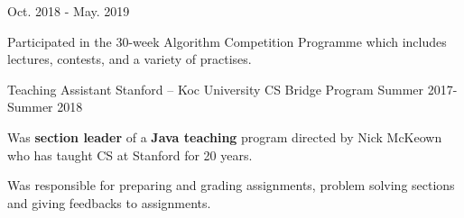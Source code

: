 \begin{cventries}
    {Oct. 2018 - May. 2019} %
    {
      \begin{cvitems} %
        \item {Participated in the 30-week Algorithm Competition Programme which includes lectures, contests, and a variety of practises.}
      \end{cvitems}
    }
    \vspace{2mm}
  \cventry
    {Teaching Assistant } %
    {Stanford – Koc University CS Bridge Program} %
    {} %
    {Summer 2017-Summer 2018} %
    {
      \begin{cvitems} %
        \item {Was \textbf{section leader} of a \textbf{Java teaching} program directed by Nick McKeown who has taught CS at Stanford for 20 years.}
        \item {Was responsible for preparing and grading assignments, problem solving sections and giving feedbacks to assignments.}
      \end{cvitems}
    }
  \vspace{2mm}

\begin{comment}
Commented code

\cventry
    {Member} %
    {Association for Computing Machinery Society} %
    {Koc Universtiy} %
    {Oct. 2017 - Present} %
    {
      \begin{cvitems} %
        \item {Responsible for organizing IoT and robotics related workshops, conferences for new members. }
        \item {Developing tech-projects to attend national and international competitions. }
      \end{cvitems}
    }

  \cventry
    {Global Volunteer in Egypt } %
    {AIESEC} %
    {Cairo, Egypt} %
    {Summer 2015} %
    {
      \begin{cvitems} %
        \item {Was a member of an international team of 30 people which was responsible from building a school from throw-out materials in a poor island in Egypt. }
      \end{cvitems}
    }

\end{comment}
\end{cventries}
